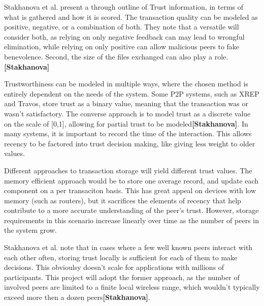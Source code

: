 \documentclass[12pt]{article}
\newcommand{\lcite}[1]
{{\bfseries\color{orange}[#1]}}
\begin{document}
			Stakhanova et al. present a through outline of Trust information, in terms of what is gathered and how it is scored. The transaction quality can be modeled as positive, negative, or a combination of both. They note that a versatile will consider both, as relying on only negative feedback can may lead to wrongful elimination, while relying on only positive can allow malicious peers to fake benevolence. Second, the size of the files exchanged can also play a role.\lcite{Stakhanova}

			Trustworthiness can be modeled in multiple ways, where the chosen method is entirely dependent on the needs of the system. Some P2P systems, such as XREP and Travos, store trust as a binary value, meaning that the transaction was or wasn't satisfactory. The converse approach is to model trust as a discrete value on the scale of [0,1], allowing for partial trust to be modeled\lcite{Stakhanova}. In many systems, it is important to record the time of the interaction. This allows recency to be factored into trust decision making, like giving less weight to older values.

			Different approaches to transaction storage will yield different trust values. The memory efficient approach would be to store one average record, and update each component on a per transaciton basis. This has great appeal on devices with low memory (such as routers), but it sacrifices the elements of recency that help contribute to a more accurate understanding of the peer's trust. However, storage requirements in this scenario increase linearly over time as the number of peers in the system grow.

			Stakhanova et al. note that in cases where a few well known peers interact with each other often, storing trust locally is sufficient for each of them to make decisions. This obvioulsy doesn't scale for applications with millions of participants. This project will adopt the former approach, as the number of involved peers are limited to a finite local wireless range, which wouldn't typically exceed more then a dozen peers\lcite{Stakhanova}.
\end{document}
